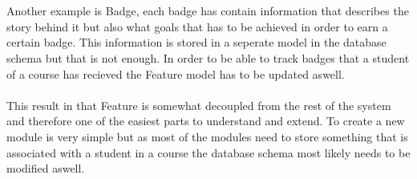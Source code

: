 \\
\\
Another example is Badge, each badge has contain information that describes the
story behind it but also what goals that has to be achieved in order to earn a
certain badge. This information is stored in a seperate model in the database
schema but that is not enough. In order to be able to track badges that a student
of a course has recieved the Feature model has to be updated aswell.\\
\\
This result in that Feature is somewhat decoupled from the rest of the system and
therefore one of the easiest parts to understand and extend. To create a new module
is very simple but as most of the modules need to store something that is associated
with a student in a course the database schema most likely needs to be modified aswell.
